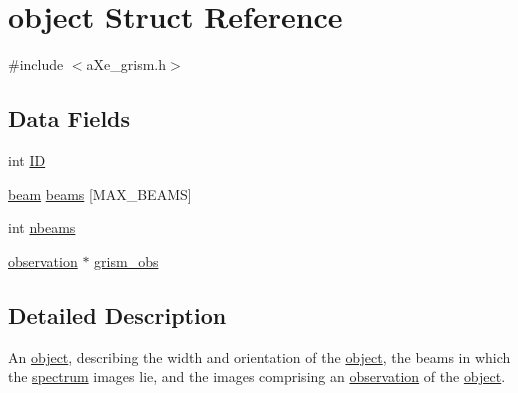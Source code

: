\hypertarget{structobject}{
\section{object Struct Reference}
\label{structobject}
}


{\ttfamily \#include $<$aXe\_\-grism.h$>$}\subsection*{Data Fields}
\begin{DoxyCompactItemize}
\item 
int \hyperlink{structobject_a8575880bdfc1c0bf44914b4efd2665bf}{ID}
\item 
\hyperlink{structbeam}{beam} \hyperlink{structobject_ad643757142781f8265b430e19700cfe5}{beams} \mbox{[}MAX\_\-BEAMS\mbox{]}
\item 
int \hyperlink{structobject_a14120e3b048a2118f7acd75ea1571c60}{nbeams}
\item 
\hyperlink{structobservation}{observation} $\ast$ \hyperlink{structobject_a90d2a68e430a65d8b022b7abd9491e3e}{grism\_\-obs}
\end{DoxyCompactItemize}


\subsection{Detailed Description}
An \hyperlink{structobject}{object}, describing the width and orientation of the \hyperlink{structobject}{object}, the beams in which the \hyperlink{structspectrum}{spectrum} images lie, and the images comprising an \hyperlink{structobservation}{observation} of the \hyperlink{structobject}{object}. 

